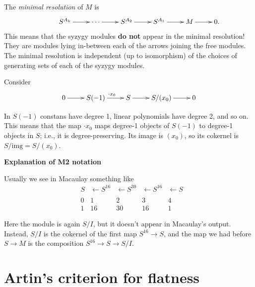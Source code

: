 The {\it minimal resolution} of $M$ is
$$
\xymatrix{
&S^{A_k}\ar[r]
&\cdots\ar[r]
&S^{A_2}\ar[r]
&S^{A_1}\ar[r]
&M\ar[r]
&0.
}
$$
This means that the syzygy modules
{\bf do not} appear in the minimal resolution!
They are modules lying in-between each of the arrows
joining the free modules.
The minimal resolution is independent
(up to isomorphism) of the choices of generating
sets of each of the syzygy modules.

\medskip\noindent
Consider
$$
\xymatrix{
0\ar[r]
&S(-1)\ar[r]^{\cdot x_0}
&S\ar[r]
&S/(x_0)\ar[r]
&0
}
$$

In $S(-1)$ constans have degree 1, linear
polynomials have degree 2, and so on. This
means that the map $\cdot x_0$ maps degree-1
objects of $S(-1)$ to degree-1 objects in
$S$; i.e., it is degree-preserving. Its image
is $(x_0)$, so its cokernel is $S/\text{img}
= S/(x_0)$.

\medskip\noindent
{\bf Explanation of M2 notation}

\noindent
Usually we see in Macaulay something like
\[
\begin{array}{cccccc}
      & S      & \xleftarrow{} S^{16} & \xleftarrow{} S^{30} & 
	\xleftarrow{} S^{16} & \xleftarrow{} S \\
      &        &        &        &        &    \\
      & 0      & 1      & 2      & 3      & 4      \\
      & 1      & 16     & 30     & 16     & 1
\end{array}
\]

Here the module is again $S/I$, but it
doesn't appear in Macaulay's output. Instead,
$S/I$ is the cokernel of the first map
$S^{16}\to S$, and the map we had before $S
\to M$ is the composition $S^{16}\to S \to
S/I$.



\section{Artin's criterion for flatness}
\label{section-artins-criterion}

